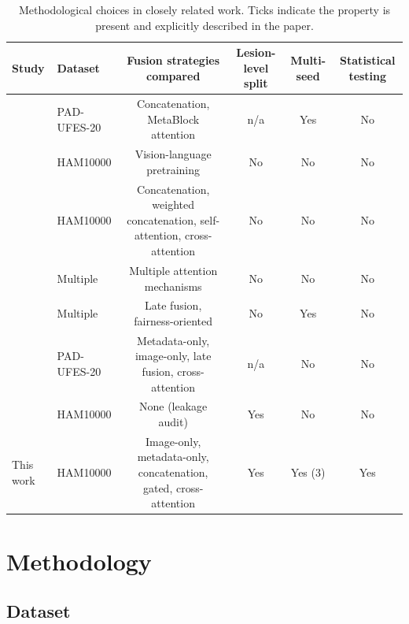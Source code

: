 \documentclass[conference]{IEEEtran}
\begin{document}
\begin{table}[t]
\caption{Methodological choices in closely related work. Ticks indicate the property is present and explicitly described in the paper.}
\label{tab:related_work}
\centering
\small
\begin{tabular}{llcccc}
\toprule
\textbf{Study} & \textbf{Dataset} & \textbf{Fusion strategies compared} & \textbf{Lesion-level split} & \textbf{Multi-seed} & \textbf{Statistical testing} \\
\midrule
\citet{pacheco2021attention}   & PAD-UFES-20 & Concatenation, MetaBlock attention & n/a & Yes & No \\
\citet{adebiyi2024accurate}    & HAM10000    & Vision-language pretraining        & No  & No  & No \\
\citet{das2025comparative}     & HAM10000    & Concatenation, weighted concatenation, self-attention, cross-attention & No & No & No \\
\citet{alfahdawi2025novel}     & Multiple    & Multiple attention mechanisms      & No  & No  & No \\
\citet{wang2024skin}           & Multiple    & Late fusion, fairness-oriented     & No  & Yes & No \\
\citet{mridha2026crossattention} & PAD-UFES-20 & Metadata-only, image-only, late fusion, cross-attention & n/a & No & No \\
\citet{jamaludin2026quantum}   & HAM10000    & None (leakage audit)               & Yes & No  & No \\
\midrule
This work                      & HAM10000    & Image-only, metadata-only, concatenation, gated, cross-attention & Yes & Yes (3) & Yes \\
\bottomrule
\end{tabular}
\end{table}

\section{Methodology}
\label{sec:methodology}

\subsection{Dataset}
\end{document}
